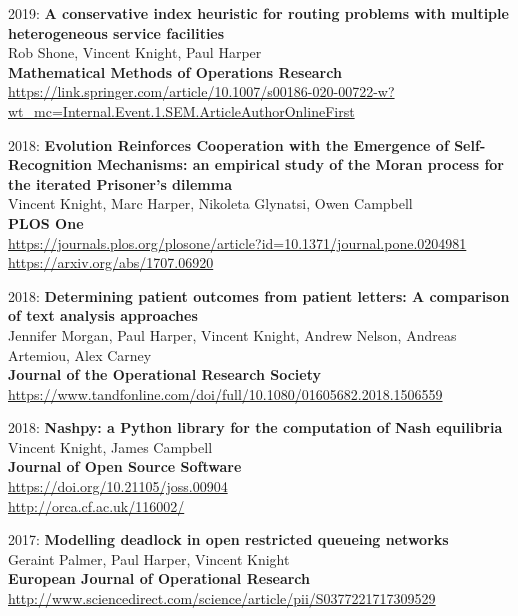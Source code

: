 \documentclass[10pt]{res} %
\begin{document}
\begin{resume}
\begin{etaremune}
\item
2019: \textbf{A conservative index heuristic for routing problems with multiple heterogeneous service facilities}\\
Rob Shone, Vincent Knight, Paul Harper
\\
\textbf{Mathematical Methods of Operations Research}
\\
\url{https://link.springer.com/article/10.1007/s00186-020-00722-w?wt_mc=Internal.Event.1.SEM.ArticleAuthorOnlineFirst}
\\

\item
2018: \textbf{Evolution Reinforces Cooperation with the Emergence of Self-Recognition Mechanisms: an empirical study of the Moran process for the iterated Prisoner's dilemma }\\
Vincent Knight, Marc Harper, Nikoleta Glynatsi, Owen Campbell
\\
\textbf{PLOS One}
\\
\url{https://journals.plos.org/plosone/article?id=10.1371/journal.pone.0204981}
\\
\url{https://arxiv.org/abs/1707.06920}
\\

\item
2018: \textbf{Determining patient outcomes from patient letters: A comparison of text analysis approaches}\\
Jennifer Morgan, Paul Harper, Vincent Knight, Andrew Nelson, Andreas Artemiou, Alex Carney
\\
\textbf{Journal of the Operational Research Society}
\\
\url{https://www.tandfonline.com/doi/full/10.1080/01605682.2018.1506559}
\\

\item
2018: \textbf{Nashpy: a Python library for the computation of Nash equilibria}\\
Vincent Knight, James Campbell
\\
\textbf{Journal of Open Source Software}
\\
\url{https://doi.org/10.21105/joss.00904}
\\
\url{http://orca.cf.ac.uk/116002/}
\\

\item
2017: \textbf{Modelling deadlock in open restricted queueing networks}\\
Geraint Palmer, Paul Harper, Vincent Knight
\\
\textbf{European Journal of Operational Research}
\\
\url{http://www.sciencedirect.com/science/article/pii/S0377221717309529}
\\


\end{etaremune}
\end{resume}
\end{document}
